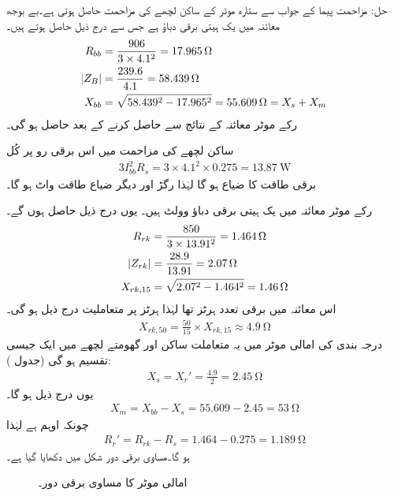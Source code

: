 حل:\quad
مزاحمت پیما کے جواب سے  ستارہ موٹر کے ساکن لچھے کی مزاحمت  حاصل ہوتی ہے۔بے بوجھ معائنہ میں یک ہیتی برقی دباؤ  ہے جس سے درج ذیل حاصل ہوتے ہیں۔
\begin{align*}
R_{bb} &=\frac{906}{3 \times 4.1^2}=\SI{17.965}{\ohm}\\
\abs{Z_B}&=\frac{239.6}{4.1}=\SI{58.439}{\ohm}\\
X_{bb}&=\sqrt{58.439^2-17.965^2}=\SI{55.609}{\ohm}=X_s+X_m
\end{align*}
رکے موٹر معائنہ کے نتائج سے  حاصل کرنے کے بعد  حاصل ہو گی۔

ساکن لچھے کی مزاحمت میں اس برقی رو پر کُل
\begin{align*}
3 I_{bb}^2 R_s=3 \times 4.1^2 \times  0.275=\SI{13.87}{\watt}
\end{align*}
برقی طاقت کا ضیاع ہو گا لہٰذا رگڑ اور دیگر ضیاع طاقت  واٹ ہو گا۔

رکے موٹر معائنہ میں یک ہیتی برقی دباؤ  وولٹ ہیں۔ یوں درج ذیل حاصل ہوں گے۔
\begin{align*}
R_{rk}&=\frac{850}{3 \times 13.91^2}=\SI{1.464}{\ohm}\\
\abs{Z_{rk}}&=\frac{28.9}{13.91}=\SI{2.07}{\ohm}\\
X_{rk, 15}&=\sqrt{2.07^2-1.464^2}=\SI{1.46}{\ohm}
\end{align*}
اس معائنہ میں برقی تعدد  ہرٹز تھا لہٰذا  ہرٹز پر متعاملیت درج ذیل ہو گی۔
\begin{align*}
X_{rk,50}=\frac{50}{15} \times X_{rk,15} \approx \SI{4.9}{\ohm}
\end{align*}
درجہ بندی   کی امالی موٹر میں یہ متعاملت ساکن اور گھومتے لچھے میں ایک جیسی تقسیم ہو گی (جدول ):
\begin{align*}
X_s=X_r'=\frac{4.9}{2}=\SI{2.45}{\ohm}
\end{align*}
یوں درج ذیل ہو گا۔
\begin{align*}
X_m=X_{bb}-X_s=55.609-2.45=\SI{53}{\ohm}
\end{align*}
چونکہ   اوہم ہے  لہٰذا
\begin{align*}
R_r'=R_{rk}-R_s=1.464-0.275=\SI{1.189}{\ohm}
\end{align*}
ہو گا۔مساوی برقی دور شکل  میں دکھایا گیا ہے۔
\begin{figure}
\centering
\caption{امالی موٹر کا مساوی برقی دور۔}
\label{شکل_امالی_موٹر_مثال_کا_دور}
\end{figure}

